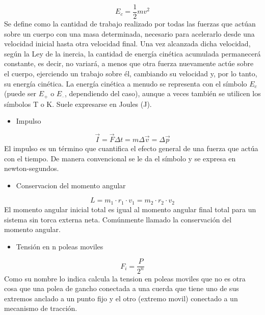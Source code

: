 \documentclass[4apaper, 12pt]{article}
\begin{document}
    \begin{equation}
        E_c=\frac12mv^2
    \end{equation}
    Se define como la cantidad de trabajo realizado por todas las fuerzas que actúan sobre un cuerpo con una masa determinada, necesario para acelerarlo desde una velocidad inicial hasta otra velocidad final. Una vez alcanzada dicha velocidad, según la Ley de la inercia, la cantidad de energía cinética acumulada permanecerá constante, es decir, no variará, a menos que otra fuerza nuevamente actúe sobre el cuerpo, ejerciendo un trabajo sobre él, cambiando su velocidad y, por lo tanto, su energía cinética.
    La energía cinética a menudo se representa con el símbolo $E_c$ (puede ser $E_+$ o $E_{–}$, dependiendo del caso), aunque a veces también se utilicen los símbolos T o K. Suele expresarse en Joules (J).
   \begin{itemize}
       \item{Impulso}
   \end{itemize}
   \begin{equation}
       \vec I=\vec F\Delta t= m \Delta
       \vec v=\Delta \vec p
   \end{equation}
   El impulso es un término que cuantifica el efecto general de una fuerza que actúa con el tiempo. De manera convencional se le da el símbolo  y se expresa en newton-segundos.
   \begin{itemize}
       \item{Conservacion del momento angular}
   \end{itemize}
      \begin{equation}
          L=m_1 \cdot r_1 \cdot v_1=m_2 \cdot r_2 \cdot v_2
      \end{equation}
    El momento angular inicial total es igual al momento angular final total para un sistema sin torca externa neta. Comúnmente llamado la conservación del momento angular.

    \begin{itemize}
        \item{Tensión en n poleas moviles}
    \end{itemize}
    \begin{equation}
        F_i=\dfrac P{2^n}
    \end{equation}
    Como su nombre lo indica calcula la tension en poleas moviles que no es otra cosa que una polea de gancho conectada a una cuerda que tiene uno de sus extremos anclado a un punto fijo y el otro (extremo movil) conectado a un mecanismo de tracción.
\end{document}

